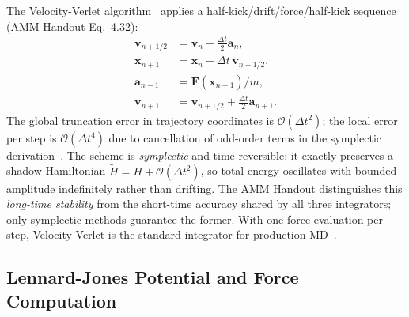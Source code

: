 \documentclass[10pt,twocolumn]{article}
\begin{document}
The Velocity-Verlet algorithm~\citep{Verlet1967,Swope1982} applies a
half-kick/drift/force/half-kick sequence (AMM Handout Eq.~4.32):
\begin{align}
  \mathbf{v}_{n+1/2} &= \mathbf{v}_n + \tfrac{\Delta t}{2}\mathbf{a}_n,
    \label{eq:vv1}\\
  \mathbf{x}_{n+1}   &= \mathbf{x}_n + \Delta t\,\mathbf{v}_{n+1/2},
    \label{eq:vv2}\\
  \mathbf{a}_{n+1}   &= \mathbf{F}(\mathbf{x}_{n+1})/m, \label{eq:vv3}\\
  \mathbf{v}_{n+1}   &= \mathbf{v}_{n+1/2}
    + \tfrac{\Delta t}{2}\mathbf{a}_{n+1}. \label{eq:vv4}
\end{align}
The global truncation error in trajectory coordinates is
$\mathcal{O}(\Delta t^2)$; the local error per step is
$\mathcal{O}(\Delta t^4)$ due to cancellation of odd-order terms in the
symplectic derivation~\citep{AMMHandout}.
The scheme is \emph{symplectic} and time-reversible: it exactly preserves a
shadow Hamiltonian $\tilde{H} = H + \mathcal{O}(\Delta t^2)$, so total energy
oscillates with bounded amplitude indefinitely rather than drifting.
The AMM Handout distinguishes this \emph{long-time stability} from the
short-time accuracy shared by all three integrators; only symplectic methods
guarantee the former.
With one force evaluation per step, Velocity-Verlet is the standard
integrator for production MD~\citep{AllenTildesley2017}.

\subsection{Lennard-Jones Potential and Force Computation}
\label{sec:lj_method}
\end{document}
